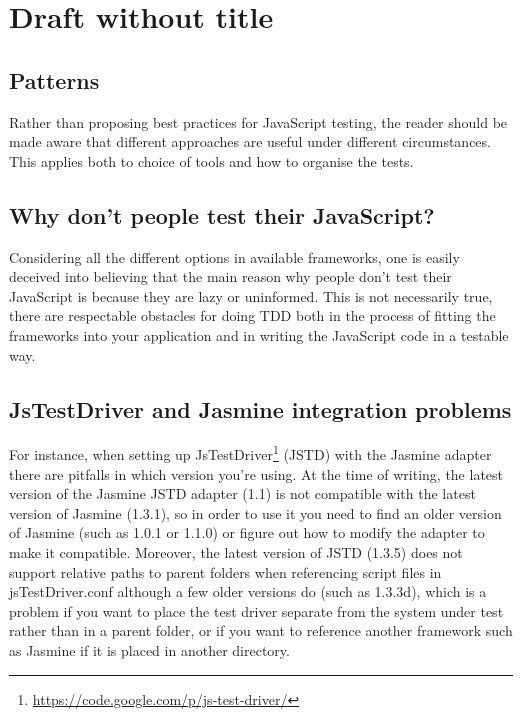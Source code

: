 \documentclass[11pt]{article}
\begin{document}
\section{Draft without title}

\subsection{Patterns}

Rather than proposing best practices for JavaScript testing, the reader should be made aware that different approaches are useful under different circumstances. This applies both to choice of tools and how to organise the tests.

\subsection{Why don't people test their JavaScript?}

Considering all the different options in available frameworks, one is easily deceived into believing that the main reason why people don't test their JavaScript is because they are lazy or uninformed. This is not necessarily true, there are respectable obstacles for doing TDD both in the process of fitting the frameworks into your application and in writing the JavaScript code in a testable way.

\subsection{JsTestDriver and Jasmine integration problems}

For instance, when setting up JsTestDriver\footnote{\url{https://code.google.com/p/js-test-driver/}} (JSTD) with the Jasmine adapter there are pitfalls in which version you're using. At the time of writing, the latest version of the Jasmine JSTD adapter (1.1) is not compatible with the latest version of Jasmine (1.3.1), so in order to use it you need to find an older version of Jasmine (such as 1.0.1 or 1.1.0) or figure out how to modify the adapter to make it compatible. Moreover, the latest version of JSTD (1.3.5) does not support relative paths to parent folders when referencing script files in jsTestDriver.conf although a few older versions do (such as 1.3.3d), which is a problem if you want to place the test driver separate from the system under test rather than in a parent folder, or if you want to reference another framework such as Jasmine if it is placed in another directory.
\end{document}
